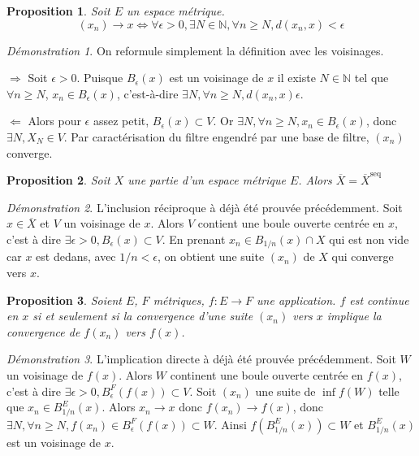 \documentclass[a4paper, 11pt, french]{book}
\newenvironment{itemise}{\itemize}{\enditemize}
\theoremstyle{plain} %
\newtheorem{proposition}{Proposition}
\theoremstyle{definition} %
\theoremstyle{remark} %
\newtheorem*{demonstration}{Démonstration}
\newcommand{\1}{\mathds{1}}
\newcommand{\N}{\mathbb{N}}
\renewcommand{\rm}[1]{\mathrm{#1}}
\newcommand\equivalence[3]{
	\begin{demonstration}
		#1
		\begin{itemise}
			\item[$\Longrightarrow$] #2
			\item[$\Longleftarrow$] #3
		\end{itemise}
	\end{demonstration}
}
\begin{document}
\begin{proposition}
	Soit $E$ un espace métrique.
	$$
	(x_n)\longrightarrow x
	\iff
	\forall\epsilon>0, \exists N\in\N, \forall n\geqslant N, d(x_n, x)<\epsilon
	$$
\end{proposition}

\equivalence{
	On reformule simplement la définition avec les voisinages.
}{
	Soit $\epsilon>0$.
	Puisque $B_\epsilon(x)$ est un voisinage de $x$ il existe $N\in\N$ tel que $\forall n\geqslant N$, $x_n\in B_\epsilon(x)$, c’est-à-dire $\exists N, \forall n\geqslant N, d(x_n, x)\epsilon$.
}{
	Alors pour $\epsilon$ assez petit, $B_\epsilon(x)\subset V$.
	Or $\exists N, \forall n\geqslant N, x_n\in B_\epsilon(x)$, donc $\exists N, X_N\in V$.
	Par caractérisation du filtre engendré par une base de filtre, $(x_n)$ converge.	
}

\begin{proposition}
	Soit $X$ une partie d'un espace métrique $E$.
	Alors $\overline{X}=\overline{X}^\rm{seq}$
\end{proposition}

\begin{demonstration}
	L'inclusion réciproque à déjà été prouvée précédemment.
	Soit $x\in\overline{X}$ et $V$ un voisinage de $x$.
	Alors $V$ contient une boule ouverte centrée en $x$, c'est à dire $\exists\epsilon>0, B_\epsilon(x)\subset V$.
	En prenant $x_n\in B_{1/n}(x)\cap X$ qui est non vide car $x$ est dedans, avec $1/n<\epsilon$, on obtient une suite $(x_n)$ de $X$ qui converge vers $x$.
\end{demonstration}

\begin{proposition}
	Soient $E$, $F$ métriques, $f:E\rightarrow F$ une application.
	$f$ est continue en $x$ si et seulement si la convergence d'une suite $(x_n)$ vers $x$ implique la convergence de $f(x_n)$ vers $f(x)$.
\end{proposition}

\begin{demonstration}
	L'implication directe à déjà été prouvée précédemment.
	Soit $W$ un voisinage de $f(x)$.
	Alors $W$ continent une boule ouverte centrée en $f(x)$, c'est à dire $\exists\epsilon>0, B^F_\epsilon(f(x))\subset V$.
	Soit $(x_n)$ une suite de $\inf{f}(W)$ telle que $x_n\in B^E_{1/n}(x)$.
	Alors $x_n\rightarrow x$ donc $f(x_n)\rightarrow f(x)$, donc $\exists N, \forall n\geqslant N, f(x_n)\in B^F_\epsilon(f(x))\subset W$.
	Ainsi $f(B^E_{1/n}(x))\subset W$ et $B^E_{1/n}(x)$ est un voisinage de $x$.
\end{demonstration}
\end{document}
